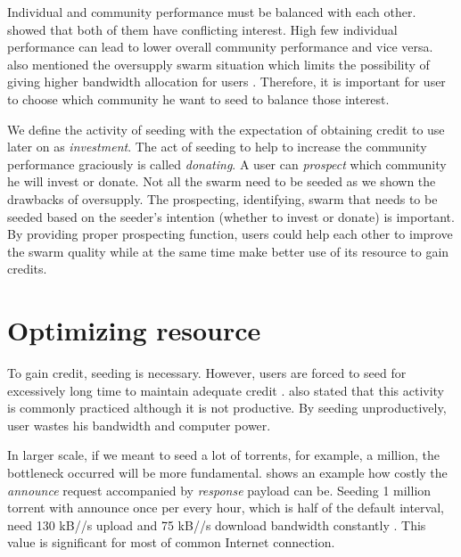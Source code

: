 Individual and community performance must be balanced with each other. \citeauthor{2015:sustainabilitypt:vinko} showed that both of them have conflicting interest. High few individual performance can lead to lower overall community performance and vice versa.  \citeauthor{2013:survivepriv:jia} also mentioned the oversupply swarm situation which limits the possibility of giving higher bandwidth allocation for users \cite{2013:survivepriv:jia}. Therefore, it is important for user to choose which community he want to seed to balance those interest.

We define the activity of seeding with the expectation of obtaining credit to use later on as \textit{investment}. The act of seeding to help to increase the community performance graciously is called \textit{donating}. A user can \textit{prospect} which community he will invest or donate. Not all the swarm need to be seeded as we shown the drawbacks of oversupply. The prospecting, identifying, swarm that needs to be seeded based on the seeder's intention (whether to invest or donate) is important. By providing proper prospecting function, users could help each other to improve the swarm quality while at the same time make better use of its resource to gain credits. 


\section{Optimizing resource}
To gain credit, seeding is necessary. However, users are forced to seed for excessively long time to maintain adequate credit \cite{2013:survivepriv:jia}. \citeauthor{2013:survivepriv:jia} also stated that this activity is commonly practiced although it is not productive. By seeding unproductively, user wastes his bandwidth and computer power.

In larger scale, if we meant to seed a lot of torrents, for example, a million, the bottleneck occurred will be more fundamental. \citeauthor{2012:milliontorrent:arvid} shows an example how costly the \textit{announce} request accompanied by \textit{response} payload can be. Seeding 1 million torrent with announce once per every hour, which is half of the default interval, need 130 kB//s upload and 75 kB//s download bandwidth constantly \cite{2012:milliontorrent:arvid}. This value is significant for most of common Internet connection.

